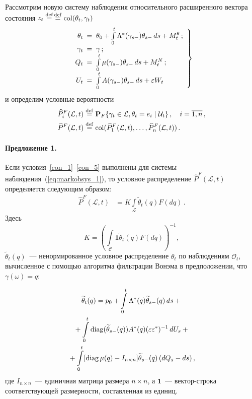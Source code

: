 \begin{multicols}{2}
 Рассмотрим новую систему наблюдения относительного расширенного вектора
состояния $z_t \stackrel{\mathrm {def}}{=} $\linebreak $\stackrel{\mathrm {def}}{=}\mathop{\mathrm{col}}(\theta_t,\gamma_t)$
 \begin{equation}
 \left.
 \begin{array}{rl}
\tabcolsep=0pt
 \displaystyle \theta_t\!\!\!&=\;\theta_0+\int\limits_0^t \Lambda^*(\gamma_{s-}) \theta_{s-}\,ds +
 M^{\theta}_t\,; \\
 \gamma_t\!\!\!&=\;\gamma\,; \\
 \displaystyle Q_t\!\!\!&=\;\int\limits_0^t \mu(\gamma_{s-}) \theta_{s-}\,ds +
 M^{N}_t\,;\\
 \displaystyle U_t\!\!\!&=\;\int\limits_0^t A(\gamma_{s-}) \theta_{s-}\,ds + \varepsilon
 W_t
 \end{array}
 \right\}
 \label{eq:markobsys_1}
\end{equation}
 и определим условные вероятности
\begin{align*}
\widehat{P}^F_i(\mathcal{L},t) &\stackrel{\mathrm {def}}{=}
 \mathbf{P}_F\{\gamma_t \in \mathcal{L},
 \theta_t =e_i\;|\; \mathcal{U}_t\}\,,\quad
 i =\overline{1,n}\,,\\
\widehat{P}^F(\mathcal{L},t)& \stackrel{\mathrm {def}}{=} \mathop{\mathrm{col}}
 (\widehat{P}^F_1(\mathcal{L},t),\ldots,\widehat{P}^F_n(\mathcal{L},t))\,.
\end{align*}

\paragraph*{Предложение 1.}Если условия~\ref{con_1}--\ref{con_5} выполнены для системы
 наблюдения~(\ref{eq:markobsys_1}), то условное распределение $\widehat{P}^F(\mathcal{L},t)$
 определяется следующим образом:
\begin{align*}
 \widehat{P}^F(\mathcal{L},t)&=K\displaystyle \int\limits_{\mathcal{L} }
 \widetilde{\theta}_t(q)F(dq)\,. %
\end{align*}
Здесь
$$K=\left(\int\limits_{\mathcal{C}}
 \mathbf{1}\widetilde{\theta}_t(q)F(dq)\right)^{-1},$$
$\widetilde{\theta}_t(q)$~--- ненормированное условное распределение $\theta_t$ по наблюдениям $\mathcal{O}_t$,
 вычисленное с помощью алгоритма фильтрации Вонэма в предположении,
 что $\gamma(\omega)= q$:
 
 \noindent
 \begin{multline}
 \widetilde{\theta}_t(q)=p_0+
 \int\limits_0^t\Lambda^*(q)\widetilde{\theta}_{s-}(q)\,ds +{}\\
{} +
 \int\limits_0^t
 \mathop{\mathrm{ diag}} (\widetilde{\theta}_{s-}(q)) A^*(q)(\varepsilon \varepsilon^*)^{-1}\,dU_s+ {}\\
{}+
 \int\limits_0^t
 [\mathop{\mathrm{ diag}} \mu(q)-I_{n \times n}]\widetilde{\theta}_{s-}(q)\,(dQ_s-ds)\,,
 \label{eq:wonham}
\end{multline}
 где
$I_{n \times n}$~--- единичная матрица размера $n \times n$,
а $\mathbf{1}$~--- вектор-строка соответствующей размерности,
составленная из единиц.


\end{multicols}
